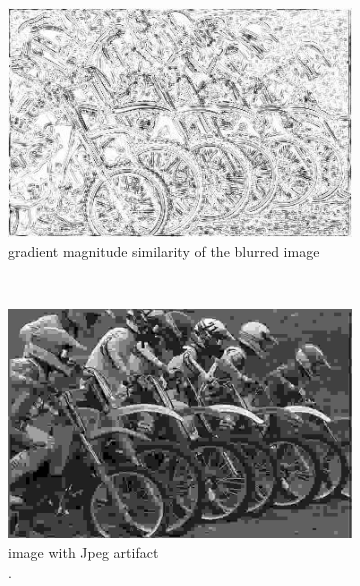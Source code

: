 \begin{figure}
\begin{subfigure}[b]{0.3\textwidth}
         \centering
         \includegraphics[width=\textwidth]{./figs/blur_sim}
         \caption{gradient magnitude similarity of the blurred image}
         \label{fig:gmsd_blur_sim}
     \end{subfigure}
     \\
     \begin{subfigure}[b]{0.3\textwidth}
         \centering
         \includegraphics[width=\textwidth]{./figs/jpeg_gry}
         \caption{image with Jpeg artifact\\.}
         \label{fig:gmsd_jpeg_gry}
     \end{subfigure}
     \hfill
     \begin{subfigure}[b]{0.3\textwidth}
         \centering

\end{subfigure}
\end{figure}
